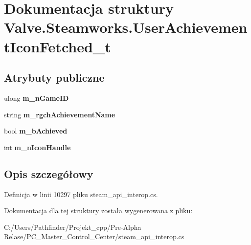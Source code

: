 \hypertarget{struct_valve_1_1_steamworks_1_1_user_achievement_icon_fetched__t}{}\section{Dokumentacja struktury Valve.\+Steamworks.\+User\+Achievement\+Icon\+Fetched\+\_\+t}
\label{struct_valve_1_1_steamworks_1_1_user_achievement_icon_fetched__t}
\subsection*{Atrybuty publiczne}
\begin{DoxyCompactItemize}
\item 
\mbox{\label{struct_valve_1_1_steamworks_1_1_user_achievement_icon_fetched__t_af614b52e4242109390e57b14d8361e07}} 
ulong {\bfseries m\+\_\+n\+Game\+ID}
\item 
\mbox{\label{struct_valve_1_1_steamworks_1_1_user_achievement_icon_fetched__t_ad14ba0b67d6aeb2f816594a4e16430c8}} 
string {\bfseries m\+\_\+rgch\+Achievement\+Name}
\item 
\mbox{\label{struct_valve_1_1_steamworks_1_1_user_achievement_icon_fetched__t_a4419836f7bff81125dffa3481157ca4b}} 
bool {\bfseries m\+\_\+b\+Achieved}
\item 
\mbox{\label{struct_valve_1_1_steamworks_1_1_user_achievement_icon_fetched__t_a6b1cc091f32232429cc2a818a1032215}} 
int {\bfseries m\+\_\+n\+Icon\+Handle}
\end{DoxyCompactItemize}


\subsection{Opis szczegółowy}


Definicja w linii 10297 pliku steam\+\_\+api\+\_\+interop.\+cs.



Dokumentacja dla tej struktury została wygenerowana z pliku\+:\begin{DoxyCompactItemize}
\item 
C\+:/\+Users/\+Pathfinder/\+Projekt\+\_\+cpp/\+Pre-\/\+Alpha Relase/\+P\+C\+\_\+\+Master\+\_\+\+Control\+\_\+\+Center/steam\+\_\+api\+\_\+interop.\+cs\end{DoxyCompactItemize}
